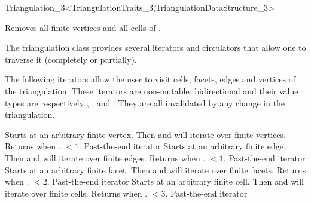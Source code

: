 \begin{ccRefClass}{Triangulation_3<TriangulationTraits_3,TriangulationDataStructure_3>}

{Removes all finite vertices and all cells of \ccVar.}


The triangulation class provides several iterators and circulators
that allow one to traverse it (completely or partially).


The following iterators allow the user to visit cells,
facets, edges and vertices of the
triangulation. These iterators are non-mutable, bidirectional and
their value types are respectively , , 
and . They are all invalidated by any change in the
triangulation. 

{Starts at an arbitrary finite vertex. Then \ccc{++} and \ccc{--} will
iterate over finite vertices. Returns  when
\ccVar. $<1$.} 
\ccGlue
{}
{Past-the-end iterator}
\ccGlue
{}
{Starts at an arbitrary finite edge. Then \ccc{++} and \ccc{--} will
iterate over finite edges. Returns  when
\ccVar. $<1$.} 
\ccGlue
{}
{Past-the-end iterator}
\ccGlue
{}
{Starts at an arbitrary finite facet. Then \ccc{++} and \ccc{--} will
iterate over finite facets. Returns  when
\ccVar. $<2$.}
\ccGlue
{}
{Past-the-end iterator}
\ccGlue
{}
{Starts at an arbitrary finite cell. Then \ccc{++} and \ccc{--} will
iterate over finite cells. Returns  when
\ccVar. $<3$.}
\ccGlue
{}
{Past-the-end iterator}


\end{ccRefClass}
